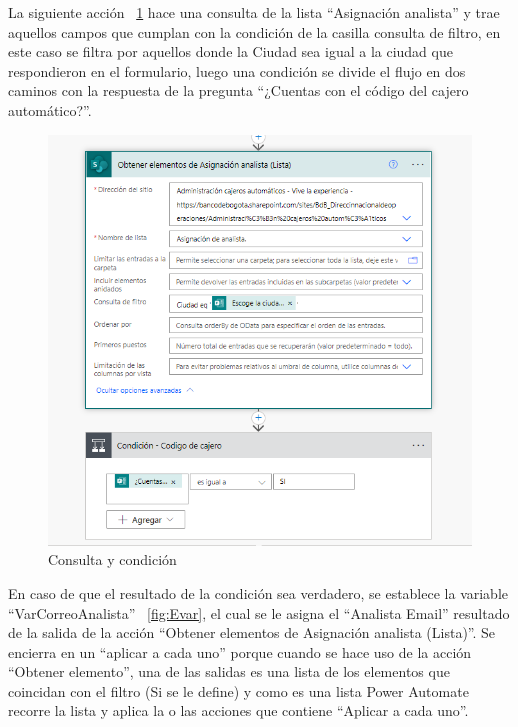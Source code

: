 La siguiente acción ~\ref{fig:Consultaycondición} hace una consulta de la lista ``Asignación analista'' y trae aquellos campos que cumplan con la condición de la casilla consulta de filtro, en este caso se filtra por aquellos donde la Ciudad sea igual a la ciudad que respondieron en el formulario, luego una condición se divide el flujo en dos caminos con la respuesta de la pregunta ``¿Cuentas con el código del cajero automático?''.
\begin{figure}[H]
	\centering
	\includegraphics[scale=0.5]{Capitulo3/imagenes/flujo3.png}
	\caption{Consulta y condición}
	\label{fig:Consultaycondición}
\end{figure}

En caso de que el resultado de la condición sea verdadero, se establece la variable ``VarCorreoAnalista'' ~\ref{fig:Evar}, el cual se le asigna el ``Analista Email'' resultado de la salida de la acción ``Obtener elementos de Asignación analista (Lista)''. Se encierra en un ``aplicar a cada uno'' porque cuando se hace uso de la acción ``Obtener elemento'', una de las salidas es una lista de los elementos que coincidan con el filtro (Si se le define) y como es una lista Power Automate recorre la lista y aplica la o las acciones que contiene ``Aplicar a cada uno''.

